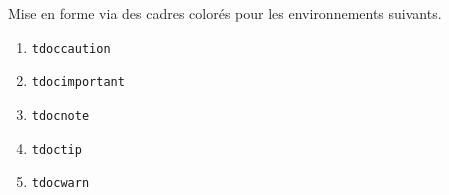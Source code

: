 \begin{tdocnew}
    \item Mise en forme via des cadres colorés pour les environnements suivants.
    \bgroup
    \setlength{\multicolsep}{3.0pt plus 1.0pt minus 0.75pt}
    \begin{multicols}{3}
        \begin{enumerate}
        	\item \verb#tdoccaution#
        	\item \verb#tdocimportant#
        	\item \verb#tdocnote#
        	\item \verb#tdoctip#
        	\item \verb#tdocwarn#
        \end{enumerate}
    \end{multicols}
    \egroup
\end{tdocnew}
